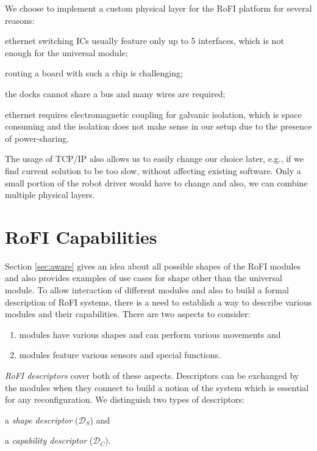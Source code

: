 We choose to implement a custom physical layer for the RoFI platform
for several reasons:
\begin{enumerate*}
    \item ethernet switching ICs usually feature only up to 5 interfaces, which
    is not enough for the universal module;
    \item routing a board with such a chip is challenging;
    \item the docks cannot share a bus and many wires are required;
    \item ethernet requires electromagnetic coupling for galvanic isolation,
    which is space consuming and the isolation does not make sense in our setup
    due to the presence of power-sharing.
\end{enumerate*}

The usage of TCP/IP also allows us to easily change our choice later, e.g., if
we find current solution to be too slow, without affecting existing software.
Only a small portion of the robot driver would have to change and also, we can
combine multiple physical layers.


\section{RoFI Capabilities}\label{sec:capabilities}

Section \ref{sec:aware} gives an idea about all possible shapes of the RoFI
modules and also provides examples of use cases for shape other than the
universal module. To allow interaction of different modules and also to build a
formal description of RoFI systems, there is a need to establish a way to
describe various modules and their capabilities. There are two aspects to
consider:
\begin{enumerate}
    \item modules have various shapes and can perform various movements and
    \item modules feature various sensors and special functions.
\end{enumerate}

\emph{RoFI descriptors} cover both of these aspects. Descriptors can be
exchanged by the modules when they connect to build a notion of the system which
is essential for any reconfiguration. We distinguish two types of descriptors:
\begin{enumerate*}
    \item a \emph{shape descriptor} ($\mathcal{D}_S$) and
    \item a \emph{capability descriptor} ($\mathcal{D}_C$).
\end{enumerate*}

